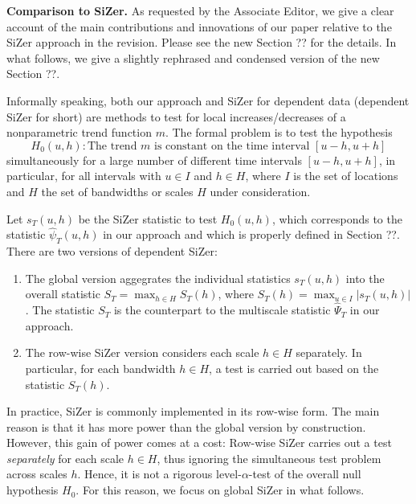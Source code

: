 \documentclass[a4paper,12pt]{article}
\begin{document}
\textbf{Comparison to SiZer.} As requested by the Associate Editor, we give a clear account of the main contributions and innovations of our paper relative to the SiZer approach in the revision. Please see the new Section ?? for the details. In what follows, we give a slightly rephrased and condensed version of the new Section ??. 


Informally speaking, both our approach and SiZer for dependent data (dependent SiZer for short) are methods to test for local increases/decreases of a nonparametric trend function $m$. The formal problem is to test the hypothesis
\[ H_0(u,h): \text{The trend } m \text{ is constant on the time interval } [u-h,u+h] \]
simultaneously for a large number of different time intervals $[u-h,u+h]$, in particular, for all intervals with $u \in I$ and $h \in H$, where $I$ is the set of locations and $H$ the set of bandwidths or scales $H$ under consideration. 


Let $s_T(u,h)$ be the SiZer statistic to test $H_0(u,h)$, which corresponds to the statistic $\widehat{\psi}_T(u,h)$ in our approach and which is properly defined in Section ??. There are two versions of dependent SiZer: 
\begin{enumerate}[label=(\alph*), leftmargin=0.8cm]

\item The global version aggegrates the individual statistics $s_T(u,h)$ into the overall statistic $S_T = \max_{h \in H} S_T(h)$, where $S_T(h) = \max_{u \in I} |s_T(u,h)|$. The statistic $S_T$ is the counterpart to the multiscale statistic $\widehat{\Psi}_T$ in our approach. 

\item The row-wise SiZer version considers each scale $h \in H$ separately. In particular, for each bandwidth $h \in H$, a test is carried out based on the statistic $S_T(h)$. 

\end{enumerate}
In practice, SiZer is commonly implemented in its row-wise form. The main reason is that it has more power than the global version by construction. However, this gain of power comes at a cost: Row-wise SiZer carries out a test \textit{separately} for each scale $h \in H$, thus ignoring the simultaneous test problem across scales $h$. Hence, it is not a rigorous level-$\alpha$-test of the overall null hypothesis $H_0$. For this reason, we focus on global SiZer in what follows. 
\end{document}
